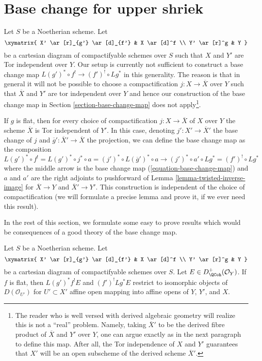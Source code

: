\section{Base change for upper shriek}
\label{section-base-change-shriek}

\noindent
Let $S$ be a Noetherian scheme. Let
$$
\xymatrix{
X' \ar[r]_{g'} \ar[d]_{f'} & X \ar[d]^f \\
Y' \ar[r]^g & Y
}
$$
be a cartesian diagram of compactifyable schemes over $S$ such that
$X$ and $Y'$ are Tor independent over $Y$. Our setup is currently
not sufficient to construct a base change map
$L(g')^* \circ f^! \to (f')^! \circ Lg^*$ in this generality.
The reason is that in general it will not be possible to choose
a compactification $j : X \to \overline{X}$ over $Y$ such that
$\overline{X}$ and $Y'$ are tor independent over $Y$ and hence
our construction of the base change map in
Section \ref{section-base-change-map} does not apply\footnote{
The reader who is well versed with derived algebraic geometry
will realize this is not a ``real'' problem. Namely, taking
$\overline{X}'$ to be the derived fibre product of
$\overline{X}$ and $Y'$ over $Y$, one can argue exactly as in
the next paragraph to define this map. After all, the Tor independence
of $X$ and $Y'$ guarantees that $X'$ will be an open subscheme
of the derived scheme $\overline{X}'$.}.

\medskip\noindent
If $g$ is flat, then for every choice of
compactification $j : X \to \overline{X}$ of $X$ over $Y$
the scheme $\overline{X}$ is Tor independent of $Y'$.
In this case, denoting $j' : X' \to \overline{X}'$ the
base change of $j$ and $\overline{g}' : \overline{X}' \to \overline{X}$
the projection, we can define the base change map
as the composition
$$
L(g')^* \circ f^! = L(g')^* \circ j^* \circ a =
(j')^* \circ L(\overline{g}')^* \circ a \longrightarrow
(j')^* \circ a' \circ Lg^* = (f')^! \circ Lg^*
$$
where the middle arrow is the base change map
(\ref{equation-base-change-map})
and $a$ and $a'$ are the right adjoints to pushforward
of Lemma \ref{lemma-twisted-inverse-image}
for $\overline{X} \to Y$ and $\overline{X}' \to Y'$.
This construction is independent of the choice of
compactification (we will formulate a precise lemma
and prove it, if we ever need this result).

\medskip\noindent
In the rest of this section, we formulate some easy to prove
results which would be consequences of a good theory of the
base change map.

\begin{lemma}
\label{lemma-base-change-locally}
Let $S$ be a Noetherian scheme. Let
$$
\xymatrix{
X' \ar[r]_{g'} \ar[d]_{f'} & X \ar[d]^f \\
Y' \ar[r]^g & Y
}
$$
be a cartesian diagram of compactifyable schemes over $S$.
Let $E \in D^+_\QCoh(\mathcal{O}_Y)$.
If $f$ is flat, then $L(g')^*f^!E$ and $(f')^!Lg^*E$
restrict to isomorphic objects of $D(\mathcal{O}_{U'})$
for $U' \subset X'$ affine open mapping into affine opens of $Y$, $Y'$, and $X$.
\end{lemma}

